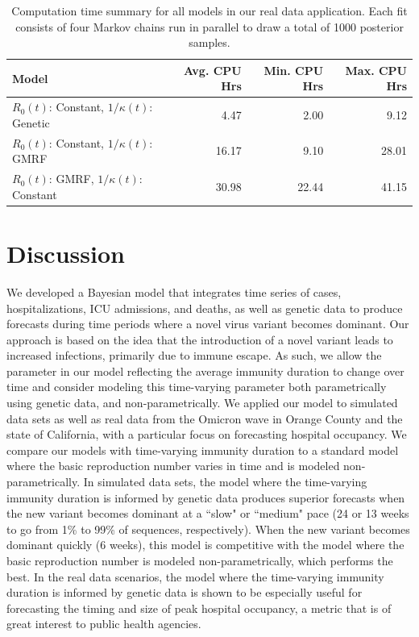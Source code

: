 \begin{table}
\caption[Computation time for models in real data application.]{Computation time summary for all models in our real data application.
Each fit consists of four Markov chains run in parallel to draw a total of 1000 posterior samples.}
\label{ch_5:table:real_data_cpu_time}
\centering
\begin{tabular}{lrrr}
 Model & Avg. CPU Hrs & Min. CPU Hrs & Max. CPU Hrs \\ 
  \hline
\( R_0(t) \): Constant, \( 1 / \kappa(t) \): Genetic & 4.47 & 2.00 & 9.12 \\ 
\( R_0(t) \): Constant, \( 1 / \kappa(t) \): GMRF & 16.17 & 9.10 & 28.01 \\ 
\( R_0(t) \): GMRF, \( 1 / \kappa(t) \): Constant & 30.98 & 22.44 & 41.15
\end{tabular}
\end{table}

\section{Discussion}
\label{ch_5:sec:discussion}

We developed a Bayesian model that integrates time series of cases, hospitalizations, ICU admissions, and deaths, as well as genetic data to produce forecasts during time periods where a novel virus variant becomes dominant.
Our approach is based on the idea that the introduction of a novel variant leads to increased infections, primarily due to immune escape.
As such, we allow the parameter in our model reflecting the average immunity duration to change over time and consider modeling this time-varying parameter both parametrically using genetic data, and non-parametrically.
We applied our model to simulated data sets as well as real data from the Omicron wave in Orange County and the state of California, with a particular focus on forecasting hospital occupancy.
We compare our models with time-varying immunity duration to a standard model where the basic reproduction number varies in time and is modeled non-parametrically.
In simulated data sets, the model where the time-varying immunity duration is informed by genetic data produces superior forecasts when the new variant becomes dominant at a ``slow" or ``medium" pace (24 or 13 weeks to go from 1\% to 99\% of sequences, respectively).
When the new variant becomes dominant quickly (6 weeks), this model is competitive with the model where the basic reproduction number is modeled non-parametrically, which performs the best.
In the real data scenarios, the model where the time-varying immunity duration is informed by genetic data is shown to be especially useful for forecasting the timing and size of peak hospital occupancy, a metric that is of great interest to public health agencies.

